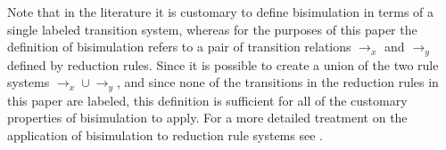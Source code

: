 Note that in the literature it is customary to define bisimulation in terms of a single labeled transition system, whereas for the purposes of this paper the definition of bisimulation refers to a pair of transition relations $\rightarrow_x$ and $\rightarrow_y$ defined by reduction rules. Since it is possible to create a union of the two rule systems $\rightarrow_x \cup \rightarrow_y$, and since none of the transitions in the reduction rules in this paper are labeled, this definition is sufficient for all of the customary properties of bisimulation to apply. For a more detailed treatment on the application of bisimulation to reduction rule systems see \cite{GSE:barbedbisimulation}.


%
%
%
%

